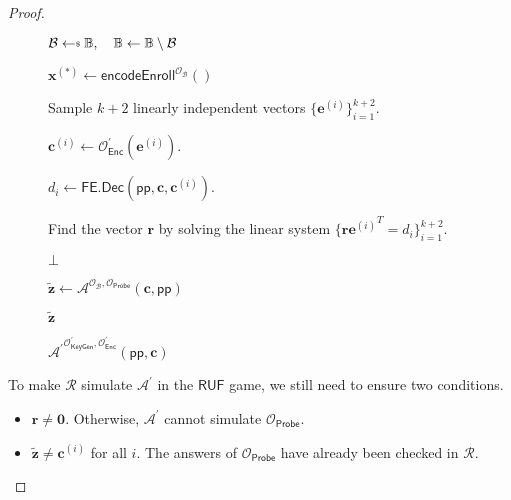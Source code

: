 \begin{proof}
\begin{figure}[h]
	\begin{minipage}[t]{0.8\linewidth}
	\centering
	\begin{algorithm}[H]
	\caption{$ {\mathcal{A}^\prime}^{ \mathcal{O}^\prime_{\textsf{KeyGen}}, \mathcal{O}^\prime_{\textsf{Enc}} } (\textsf{pp}, \mathbf{c}) $}
	\label{alg:adv:ind-uf-OB-Probe}
	\begin{algorithmic}[1]
		\State $\mathcal{B} \getsdollar \mathbb{B}, \quad \mathbb{B} \gets \mathbb{B} \setminus \mathcal{B}$ \label{alg:adv:ind-uf-OB-Probe:B}
		
		\State $\mathbf{x}^{(*)} \gets \textsf{encodeEnroll}^{ \mathcal{O}_{\mathcal{B}} } ()$

		\State Sample $k+2$ linearly independent vectors $\{ \mathbf{e}^{(i)} \}_{i=1}^{k+2}$.

			\State $\mathbf{c}^{(i)} \gets \mathcal{O}^\prime_{\textsf{Enc}}(\mathbf{e}^{(i)})$.

			\State $d_i \gets \textsf{FE.Dec}(\textsf{pp}, \mathbf{c}, \mathbf{c}^{(i)})$.
		\EndFor

		\State Find the vector $\mathbf{r}$ by solving the linear system $\{ \mathbf{r} {\mathbf{e}^{(i)}}^T = d_i \}_{i=1}^{k+2}$.


			\State \Return $\bot$

		\EndIf

		\State ${\mathbf{\tilde{z}}} \gets \mathcal{A}^{\mathcal{O}_{\mathcal{B}}, \mathcal{O}_{\textsf{Probe}} } ( \mathbf{c}, \textsf{pp})$
		
		\State \Return ${\mathbf{\tilde{z}}}$
	\end{algorithmic}
	\end{algorithm}
	\end{minipage}
	
\end{figure}

To make $\mathcal{R}$ simulate $\mathcal{A}^\prime$ in the $\textsf{RUF}$ game, we still need to ensure two conditions.

\begin{itemize}

	\item $\mathbf{r} \neq \mathbf{0}$. Otherwise, $\mathcal{A}^\prime$ cannot simulate $\mathcal{O}_\textsf{Probe}$. 

	\item $\mathbf{\tilde{z}} \neq \mathbf{c}^{(i)}$ for all $i$. The answers of $\mathcal{O}_\textsf{Probe}$ have already been checked in $\mathcal{R}$. 
\end{itemize}


\end{proof}
